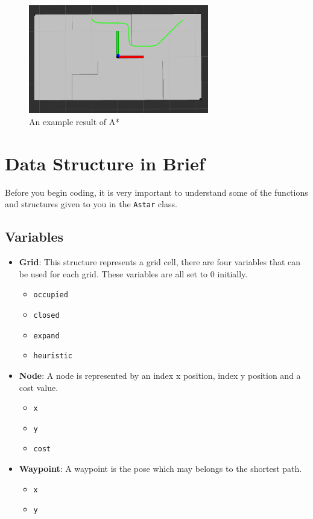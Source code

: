 \documentclass[twoside,11pt]{article}
\begin{document}
\begin{figure}[h!]
\caption{An example result of A*}
\centering
\includegraphics[width=0.7\textwidth]{./figures/path-demo.png}
\end{figure}

\section*{Data Structure in Brief}

Before you begin coding, it is very important to understand some of the functions and structures
given to you in the \texttt{Astar} class.

\subsection*{Variables}
\begin{itemize}
	\item \textbf{Grid}: This structure represents a grid cell, there are four variables that can be used for each
	grid. These variables are all set to 0 initially.
	\begin{itemize}
		\item \texttt{occupied} 
		\item \texttt{closed}
		\item \texttt{expand}
		\item \texttt{heuristic}
	\end{itemize}
	\item \textbf{Node}: A node is represented by an index x position, index y position and a cost value.
	\begin{itemize}
		\item \texttt{x} 
		\item \texttt{y}
		\item \texttt{cost} 
	\end{itemize}
	\item \textbf{Waypoint}: A waypoint is the pose which may belongs to the shortest path.
	\begin{itemize}
		\item \texttt{x}
		\item \texttt{y}
	\end{itemize}
\end{itemize}
\end{document}
